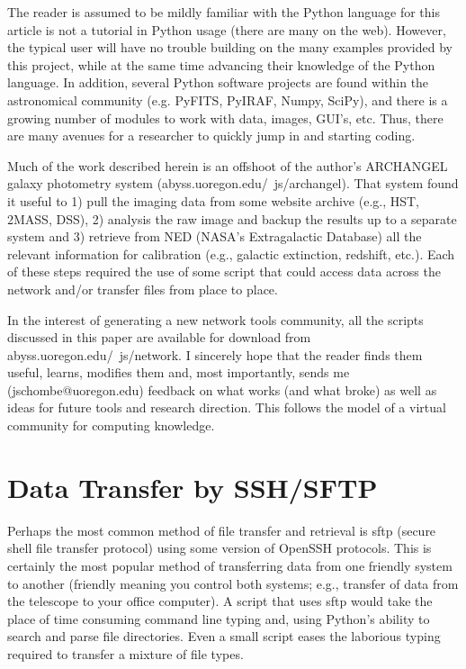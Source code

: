 \documentclass[11pt,preprint,graphicx]{aastex}
\begin{document}
\noindent The reader is assumed to be mildly familiar with the Python
language for this article is not a tutorial in Python usage (there are many
on the web).  However, the typical user will have no trouble building on the
many examples provided by this project, while at the same time advancing
their knowledge of the Python language.  In addition, several
Python software projects are found within the astronomical community (e.g.
PyFITS, PyIRAF, Numpy, SciPy), and there is a growing number of modules to
work with data, images, GUI's, etc.  Thus, there are many avenues for a
researcher to quickly jump in and starting coding.

\noindent Much of the work described herein is an offshoot of the author's
ARCHANGEL galaxy photometry system (abyss.uoregon.edu/~js/archangel).  That
system found it useful to 1) pull the imaging data from some website
archive (e.g., HST, 2MASS, DSS), 2) analysis the raw image and backup the
results up to a separate system and 3) retrieve from NED (NASA's
Extragalactic Database) all the relevant information for calibration (e.g.,
galactic extinction, redshift, etc.).  Each of these steps required the
use of some script that could access data across the network and/or
transfer files from place to place.

\noindent In the interest of generating a new network tools community, all
the scripts discussed in this paper are available for download from
abyss.uoregon.edu/~js/network.  I sincerely hope that the reader
finds them useful, learns, modifies them and, most importantly, sends me
(jschombe@uoregon.edu) feedback on what works (and what broke) as well as
ideas for future tools and research direction.  This follows the model of a
virtual community for computing knowledge.

\section{Data Transfer by SSH/SFTP}

\noindent Perhaps the most common method of file transfer and retrieval is
sftp (secure shell file transfer protocol) using some version of OpenSSH
protocols.  This is certainly the most popular method of transferring data
from one friendly system to another (friendly meaning you control both
systems; e.g., transfer of data from the telescope to your office
computer).   A script that uses sftp would take the place of time consuming
command line typing and, using Python's ability to search and parse file
directories.  Even a small script eases the laborious typing required to
transfer a mixture of file types.
\end{document}
